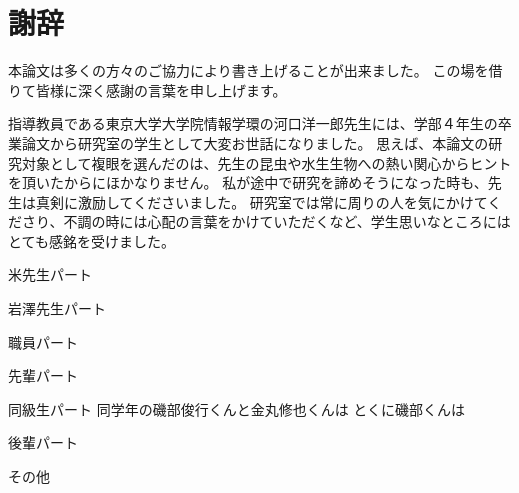 \chapter*{謝辞}

本論文は多くの方々のご協力により書き上げることが出来ました。
この場を借りて皆様に深く感謝の言葉を申し上げます。

指導教員である東京大学大学院情報学環の河口洋一郎先生には、学部４年生の卒業論文から研究室の学生として大変お世話になりました。
思えば、本論文の研究対象として複眼を選んだのは、先生の昆虫や水生生物への熱い関心からヒントを頂いたからにほかなりません。
私が途中で研究を諦めそうになった時も、先生は真剣に激励してくださいました。
研究室では常に周りの人を気にかけてくださり、不調の時には心配の言葉をかけていただくなど、学生思いなところにはとても感銘を受けました。

米先生パート

岩澤先生パート

職員パート

先輩パート

同級生パート
同学年の磯部俊行くんと金丸修也くんは
とくに磯部くんは

後輩パート

その他
